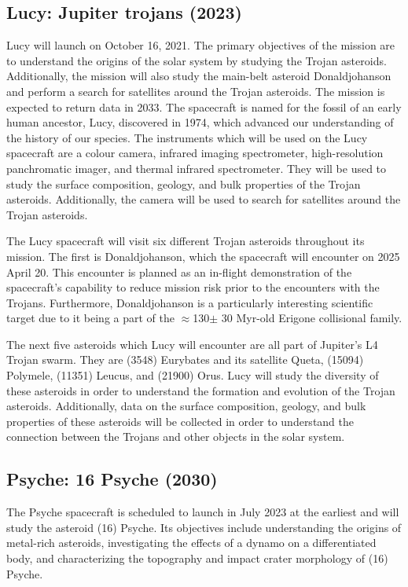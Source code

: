 \subsection{Lucy: Jupiter trojans (2023)}

Lucy will launch on October 16, 2021. The primary objectives of the mission are to understand the origins of the solar system by studying the Trojan asteroids. Additionally, the mission will also study the main-belt asteroid Donaldjohanson and perform a search for satellites around the Trojan asteroids. The mission is expected to return data in 2033. The spacecraft is named for the fossil of an early human ancestor, Lucy, discovered in 1974, which advanced our understanding of the history of our species. The instruments which will be used on the Lucy spacecraft are a colour camera, infrared imaging spectrometer, high-resolution panchromatic imager, and thermal infrared spectrometer. They will be used to study the surface composition, geology, and bulk properties of the Trojan asteroids. Additionally, the camera will be used to search for satellites around the Trojan asteroids.

The Lucy spacecraft will visit six different Trojan asteroids throughout its mission. The first is Donaldjohanson, which the spacecraft will encounter on 2025 April 20. This encounter is planned as an in-flight demonstration of the spacecraft's capability to reduce mission risk prior to the encounters with the Trojans. Furthermore, Donaldjohanson is a particularly interesting scientific target due to it being a part of the {$\approx$}130{$\pm$} 30 Myr-old Erigone collisional family.

The next five asteroids which Lucy will encounter are all part of Jupiter's L4 Trojan swarm. They are (3548) Eurybates and its satellite Queta, (15094) Polymele, (11351) Leucus, and (21900) Orus. Lucy will study the diversity of these asteroids in order to understand the formation and evolution of the Trojan asteroids. Additionally, data on the surface composition, geology, and bulk properties of these asteroids will be collected in order to understand the connection between the Trojans and other objects in the solar system.

\subsection{Psyche: 16 Psyche (2030)}

The Psyche spacecraft is scheduled to launch in July 2023 at the earliest and will study the asteroid (16) Psyche. Its objectives include understanding the origins of metal-rich asteroids, investigating the effects of a dynamo on a differentiated body, and characterizing the topography and impact crater morphology of (16) Psyche. 

